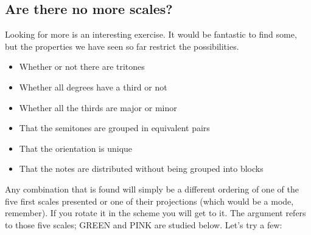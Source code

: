\documentclass[]{report}
\providecommand{\tightlist}{%
  \setlength{\itemsep}{0pt}
  \setlength{\parskip}{0pt}
}
\begin{document}
\subsection{Are there no more scales?}
Looking for more is an interesting exercise. It would be fantastic to find some, but the properties we have seen so far restrict the possibilities.
\begin{itemize} \tightlist
\item Whether or not there are tritones
\item Whether all degrees have a third or not
\item Whether all the thirds are major or minor
\item That the semitones are grouped in equivalent pairs
\item That the orientation is unique
\item That the notes are distributed without being grouped into blocks
\end{itemize}
Any combination that is found will simply be a different ordering of one of the five first scales presented or one of their projections (which would be a mode, remember). If you rotate it in the scheme you will get to it. The argument refers to those five scales; \textsf{GREEN} and \textsf{PINK} are studied below. Let's try a few:
\end{document}
